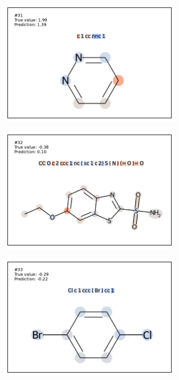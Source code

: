 \begin{figure}
\begin{subfigure}[b]{0.33\textwidth}
\end{subfigure}\begin{subfigure}[b]{0.33\textwidth} 
  \centering 
  \includegraphics[width=\textwidth]{figures/esol/esol31.pdf} 
\end{subfigure}
\begin{subfigure}[b]{0.33\textwidth} 
  \centering 
  \includegraphics[width=\textwidth]{figures/esol/esol32.pdf} 
\end{subfigure}\begin{subfigure}[b]{0.33\textwidth} 
  \centering 
  \includegraphics[width=\textwidth]{figures/esol/esol33.pdf} 

\end{subfigure}
\end{figure}
